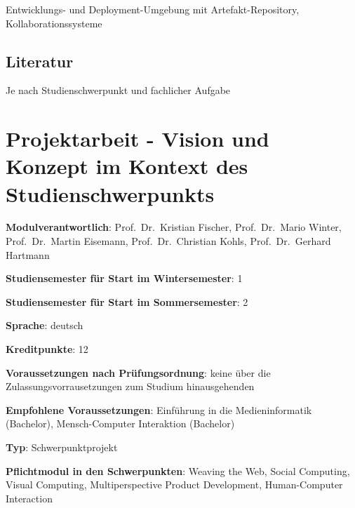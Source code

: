 Entwicklungs- und Deployment-Umgebung mit Artefakt-Repository,
Kollaborationssysteme

\section*{Literatur\label{/mi-2017/modulbeschreibungen-master/MA_Modul_Projekt_Verwertung}}\label{literaturpathlabelmi-2017modulbeschreibungen-mastermaux5fmodulux5fprojektux5fverwertung}

Je nach Studienschwerpunkt und fachlicher Aufgabe

\chapter{Projektarbeit - Vision und Konzept im Kontext des
Studienschwerpunkts\label{/mi-2017/modulbeschreibungen-master/MA_Modul_Projekt_Vision&Konzept}}\label{projektarbeit---vision-und-konzept-im-kontext-des-studienschwerpunktspathlabelmi-2017modulbeschreibungen-mastermaux5fmodulux5fprojektux5fvisionkonzept}

\begin{modulHead}
\textbf{Modulverantwortlich}: Prof.~Dr.~Kristian
Fischer, Prof.~Dr.~Mario Winter, Prof.~Dr.~Martin Eisemann,
Prof.~Dr.~Christian Kohls, Prof.~Dr.~Gerhard
Hartmann
\end{modulHead}
\begin{modulHead}
\textbf{Studiensemester für
Start im Wintersemester}:
1
\end{modulHead}
\begin{modulHead}
\textbf{Studiensemester für Start
im Sommersemester}:
2
\end{modulHead}
\begin{modulHead}
\textbf{Sprache}:
deutsch
\end{modulHead}
\begin{modulHead}
\textbf{Kreditpunkte}:
12
\end{modulHead}
\begin{modulHead}
\textbf{Voraussetzungen nach
Prüfungsordnung}: keine über die Zulassungsvorrausetzungen zum Studium
hinausgehenden
\end{modulHead}
\begin{modulHead}
\textbf{Empfohlene
Voraussetzungen}: Einführung in die Medieninformatik (Bachelor),
Mensch-Computer Interaktion
(Bachelor)
\end{modulHead}
\begin{modulHead}
\textbf{Typ}:
Schwerpunktprojekt
\end{modulHead}
\begin{modulHead}
\textbf{Pflichtmodul
in den Schwerpunkten}: Weaving the Web, Social Computing, Visual
Computing, Multiperspective Product Development, Human-Computer
Interaction
\end{modulHead}


